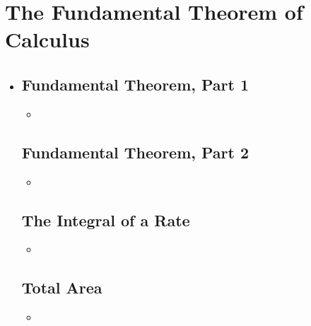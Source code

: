 \section{The Fundamental Theorem of Calculus}
\begin{itemize}
  \item []
  
  \subsection{Fundamental Theorem, Part 1}
  \begin{itemize}
    \item 
  \end{itemize}

  \subsection{Fundamental Theorem, Part 2}
  \begin{itemize}
    \item 
  \end{itemize}

  \subsection{The Integral of a Rate}
  \begin{itemize}
    \item 
  \end{itemize}
  
  \subsection{Total Area}
  \begin{itemize}
    \item 
  \end{itemize}
  
\end{itemize}

